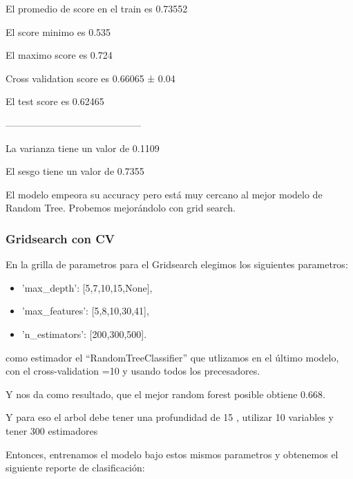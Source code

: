 \documentclass[a4paper]{article}
\begin{document}
            El promedio de score en el train es  0.73552
            
            El score minimo es 0.535
            
            El maximo score es 0.724
            
            Cross validation score es  0.66065 ± 0.04
            
            El test score es  0.62465 
            
            ------------------------------------------
            
            La varianza tiene un valor de 0.1109
            
            El sesgo tiene un valor de 0.7355

            El modelo empeora su accuracy pero está muy cercano al mejor modelo de Random Tree. Probemos mejorándolo con grid search.

        \subsubsection{Gridsearch con CV}

            En la grilla de parametros para el Gridsearch elegimos los siguientes parametros:
            \begin{itemize}
                \item 'max\_depth': [5,7,10,15,None],
                \item 'max\_features': [5,8,10,30,41],
                \item 'n\_estimators': [200,300,500].
            \end{itemize}
            como estimador el ``RandomTreeClassifier'' que utlizamos en el último modelo, con el cross-validation =10 y  usando todos los precesadores.

            Y nos da como resultado, que el mejor random forest posible obtiene 0.668. 

            Y para eso el arbol debe tener una profundidad de  15 , utilizar  10  variables y tener  300  estimadores
            
            Entonces, entrenamos el modelo bajo estos mismos parametros y obtenemos el siguiente reporte de clasificación:
\end{document}
